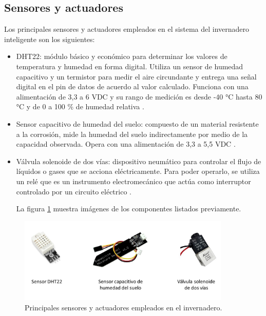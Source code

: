 \subsection{Sensores y actuadores}
\label{sec:Sensores y actuadores}
Los principales sensores y actuadores empleados en el sistema del invernadero inteligente son los siguientes:
\begin{itemize}

\item DHT22: módulo básico y económico para determinar los valores de temperatura y humedad en forma digital. Utiliza un sensor de humedad capacitivo y un termistor para medir el aire circundante y entrega una señal digital en el pin de datos de acuerdo al valor calculado. Funciona con una alimentación de 3,3 a 6 VDC y su rango de medición es desde -40 °C hasta 80 °C y de 0 a 100 \% de humedad relativa \citep{dht22}.

\item Sensor capacitivo de humedad del suelo: compuesto de un material resistente a la corrosión, mide la humedad del suelo indirectamente por medio de la capacidad observada. Opera con una alimentación de 3,3 a 5,5 VDC \citep{soilsensor}.

\item Válvula solenoide de dos vías: dispositivo neumático para controlar el flujo de líquidos o gases que se acciona eléctricamente. Para poder operarlo, se utiliza un relé que es un instrumento electromecánico que actúa como interruptor controlado por un circuito eléctrico \citep{valve}\citep{rele}.

La figura \ref{fig:sensores} muestra imágenes de los componentes listados previamente.

\end{itemize}
\begin{figure}[h]
	\centering
	\includegraphics[width=0.90\textwidth]{./Figures/sensores.jpg}
	\caption[Principales sensores y actuadores empleados en el invernadero.]{Principales sensores y actuadores empleados en el invernadero.}
	\label{fig:sensores}

\end{figure}






